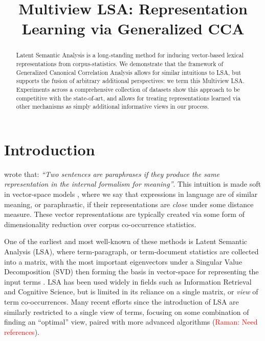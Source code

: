 \documentclass[11pt]{article}
\title{Multiview LSA: Representation Learning via Generalized CCA}
\date{}
\newcommand{\raman}[1]{ (\textcolor{red}{Raman: #1})}
\begin{document}
\maketitle
\begin{abstract}
  Latent Semantic Analysis is a long-standing method for inducing
  vector-based lexical representations from corpus-statistics.  We
  demonstrate that the framework of Generalized Canonical Correlation
  Analysis allows for similar intuitions to LSA, but supports the
  fusion of arbitrary additional perspectives: we term this Multiview
  LSA.  Experiments across a comprehensive collection of datasets show
  this approach to be competitive with the state-of-art, and allows
  for treating representations learned via other mechanisms as simply
  additional informative views in our process.
\end{abstract}

\section{Introduction}

 wrote that: \emph{``Two sentences
  are paraphrases if they produce the same representation in the
  internal formalism for meaning''}.  This intuition is made soft in
vector-space models \cite{turney2010frequency}, where we say that
expressions in language are of similar meaning, or paraphrastic, if
their representations are \emph{close} under some distance measure.
These vector representations are typically created via some form of
dimensionality reduction over corpus co-occurrence statistics.

One of the earliest and most well-known of these methods is Latent
Semantic Analysis (LSA), where term-paragraph, or term-document
statistics are collected into a matrix, with the most important
eigenvectors under a Singular Value Decomposition (SVD) then forming
the basis in vector-space for representing the input terms
\cite{landauer1997solution}.  LSA has been used widely in fields such
as Information Retrieval and Cognitive Science, but is limited in its
reliance on a single matrix, or \emph{view} of term co-occurrences.
Many recent efforts since the introduction of LSA are similarly
restricted to a single view of terms, focusing on some combination of
finding an ``optimal'' view, paired with more advanced algorithms\raman{Need references}.
\end{document}
